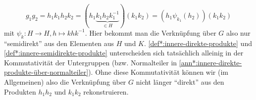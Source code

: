 \documentclass[a4paper, ngerman]{article}
\numberwithin{equation}{chapter}
\theoremstyle{plain}
\theoremstyle{definition}
\begin{document}
\begin{equation}\label{eq:innere-produkt-rekonstruktion}
    g_1g_2 = h_1k_1h_2k_2 = (h_1\underbrace{k_1h_2k_1^{-1}}_{\in H})(k_1k_2) = (h_1 \psi_{k_1}(h_2))(k_1k_2)
\end{equation}
mit \(\psi_k: H \to H, h\mapsto khk^{-1}\). 
Hier bekommt man die Verknüpfung über \(G\) also nur "`semidirekt"' aus den Elementen aus \(H\) und \(K\). \cref{def*:innere-direkte-produkte} und \cref{def*:innere-semidirekte-produkte} unterscheiden sich tatsächlich alleinig in der Kommutativität der Untergruppen (bzw. Normalteiler in \cref{ann*:innere-direkte-produkte-über-normalteiler}). 
Ohne diese Kommutativität können wir (im Allgemeinen) also die Verknüpfung über \(G\) nicht länger "`direkt"' aus den Produkten \(h_1h_2\) und \(k_1k_2\) rekonstruieren.
 
\end{document}
